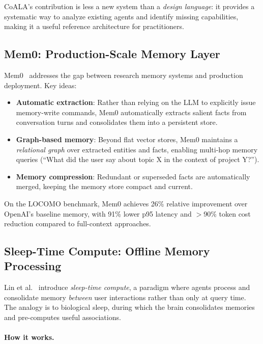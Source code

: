 CoALA’s contribution is less a new system than a \emph{design language}: it provides a systematic way to analyze existing agents and identify missing capabilities, making it a useful reference architecture for practitioners.

\subsection{Mem0: Production-Scale Memory Layer}
\label{mem0-production-scale-memory-layer}

Mem0~\cite{chhikara2025mem0} addresses the gap between research memory systems and production deployment. Key ideas:

\begin{itemize}
  \item \textbf{Automatic extraction}: Rather than relying on the LLM to explicitly issue memory-write commands, Mem0 automatically extracts salient facts from conversation turns and consolidates them into a persistent store.
  \item \textbf{Graph-based memory}: Beyond flat vector stores, Mem0 maintains a \emph{relational graph} over extracted entities and facts, enabling multi-hop memory queries (``What did the user say about topic X in the context of project Y?'').
  \item \textbf{Memory compression}: Redundant or superseded facts are automatically merged, keeping the memory store compact and current.
\end{itemize}

On the LOCOMO benchmark, Mem0 achieves 26\% relative improvement over OpenAI’s baseline memory, with 91\% lower p95 latency and $>$90\% token cost reduction compared to full-context approaches.

\subsection{Sleep-Time Compute: Offline Memory Processing}
\label{sleep-time-compute-offline-memory-processing}

Lin et al.~\cite{lin2025sleeptime} introduce \emph{sleep-time compute}, a paradigm where agents process and consolidate memory \emph{between} user interactions rather than only at query time. The analogy is to biological sleep, during which the brain consolidates memories and pre-computes useful associations.

\paragraph{How it works.}
\label{how-it-works.}


